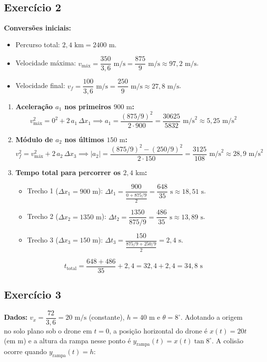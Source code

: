\documentclass[11pt, a4paper]{article}
\begin{document}
\subsection*{Exercício 2}
\textbf{Conversões iniciais:}
\begin{itemize}
    \item Percurso total: $2{,}4\text{ km} = 2400\text{ m}$.
    \item Velocidade máxima: $v_{\text{máx}} = \dfrac{350}{3{,}6}\text{ m/s} = \dfrac{875}{9}\text{ m/s} \approx 97{,}2\text{ m/s}$.
    \item Velocidade final: $v_f = \dfrac{100}{3{,}6}\text{ m/s} = \dfrac{250}{9}\text{ m/s} \approx 27{,}8\text{ m/s}$.
\end{itemize}

\begin{enumerate}[label=\textbf{(\alph*)}]
    \item \textbf{Aceleração $a_1$ nos primeiros $900\text{ m}$:}
    \[
        v_{\text{máx}}^2 = 0^2 + 2\,a_1\,\Delta x_1 \implies a_1 = \frac{(875/9)^2}{2 \cdot 900} = \frac{30625}{5832}\text{ m/s}^2 \approx 5{,}25\text{ m/s}^2
    \]

    \item \textbf{Módulo de $a_2$ nos últimos $150\text{ m}$:}
    \[
        v_f^2 = v_{\text{máx}}^2 + 2\,a_2\,\Delta x_3 \implies |a_2| = \frac{(875/9)^2 - (250/9)^2}{2 \cdot 150} = \frac{3125}{108}\text{ m/s}^2 \approx 28{,}9\text{ m/s}^2
    \]

    \item \textbf{Tempo total para percorrer os $2{,}4\text{ km}$:}
    \begin{itemize}
        \item Trecho 1 ($\Delta x_1 = 900\text{ m}$): $\Delta t_1 = \dfrac{900}{\frac{0 + 875/9}{2}} = \dfrac{648}{35}\text{ s} \approx 18{,}51\text{ s}$.
        \item Trecho 2 ($\Delta x_2 = 1350\text{ m}$): $\Delta t_2 = \dfrac{1350}{875/9} = \dfrac{486}{35}\text{ s} \approx 13{,}89\text{ s}$.
        \item Trecho 3 ($\Delta x_3 = 150\text{ m}$): $\Delta t_3 = \dfrac{150}{\frac{875/9 + 250/9}{2}} = 2{,}4\text{ s}$.
    \end{itemize}
    \[
        t_{\text{total}} = \frac{648 + 486}{35} + 2{,}4 = 32{,}4 + 2{,}4 = 34{,}8\text{ s}
    \]
\end{enumerate}

\subsection*{Exercício 3}
\textbf{Dados:} $v_x = \dfrac{72}{3{,}6} = 20\text{ m/s}$ (constante), $h = 40\text{ m}$ e $\theta = 8^\circ$.
Adotando a origem no solo plano sob o drone em $t = 0$, a posição horizontal do drone é $x(t) = 20t$ (em $\text{m}$) e a altura da rampa nesse ponto é $y_{\text{rampa}}(t) = x(t)\tan 8^\circ$. A colisão ocorre quando $y_{\text{rampa}}(t) = h$:
\end{document}

